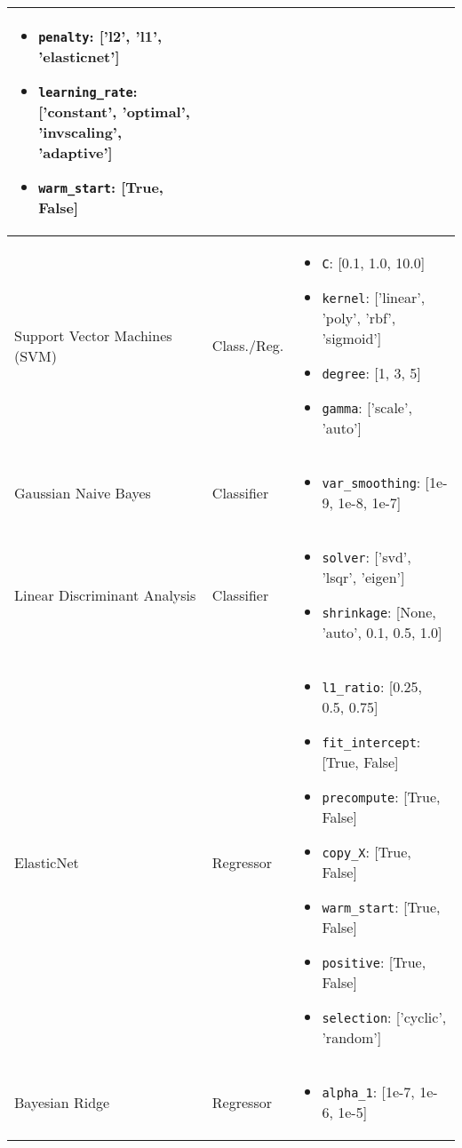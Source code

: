 \begin{longtable}{|>{\raggedright}p{2cm}|>{\raggedright}p{3cm}|>{\raggedright\arraybackslash}p{8cm}|}
\begin{itemize}
    \item \texttt{penalty}: ['l2', 'l1', 'elasticnet']
    \item \texttt{learning\_rate}: ['constant', 'optimal', 'invscaling', 'adaptive']
    \item \texttt{warm\_start}: [True, False]
\end{itemize} \\
\hline
Support Vector Machines (SVM) & Class./Reg. & 
\begin{itemize}
    \item \texttt{C}: [0.1, 1.0, 10.0]
    \item \texttt{kernel}: ['linear', 'poly', 'rbf', 'sigmoid']
    \item \texttt{degree}: [1, 3, 5]
    \item \texttt{gamma}: ['scale', 'auto']
\end{itemize} \\
\hline
Gaussian Naive Bayes & Classifier & 
\begin{itemize}
    \item \texttt{var\_smoothing}: [1e-9, 1e-8, 1e-7]
\end{itemize} \\
\hline
Linear Discriminant Analysis & Classifier & 
\begin{itemize}
    \item \texttt{solver}: ['svd', 'lsqr', 'eigen']
    \item \texttt{shrinkage}: [None, 'auto', 0.1, 0.5, 1.0]
\end{itemize} \\
\hline
ElasticNet & Regressor & 
\begin{itemize}
    \item \texttt{l1\_ratio}: [0.25, 0.5, 0.75]
    \item \texttt{fit\_intercept}: [True, False]
    \item \texttt{precompute}: [True, False]
    \item \texttt{copy\_X}: [True, False]
    \item \texttt{warm\_start}: [True, False]
    \item \texttt{positive}: [True, False]
    \item \texttt{selection}: ['cyclic', 'random']
\end{itemize} \\
\hline
Bayesian Ridge & Regressor & 
\begin{itemize}
    \item \texttt{alpha\_1}: [1e-7, 1e-6, 1e-5]

\end{itemize}
\end{longtable}
